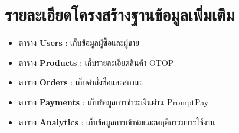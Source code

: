 \section{รายละเอียดโครงสร้างฐานข้อมูลเพิ่มเติม}
\begin{itemize}
  \item ตาราง \textbf{Users} : เก็บข้อมูลผู้ซื้อและผู้ขาย
  \item ตาราง \textbf{Products} : เก็บรายละเอียดสินค้า OTOP
  \item ตาราง \textbf{Orders} : เก็บคำสั่งซื้อและสถานะ
  \item ตาราง \textbf{Payments} : เก็บข้อมูลการชำระเงินผ่าน PromptPay
  \item ตาราง \textbf{Analytics} : เก็บข้อมูลการเข้าชมและพฤติกรรมการใช้งาน
\end{itemize}
